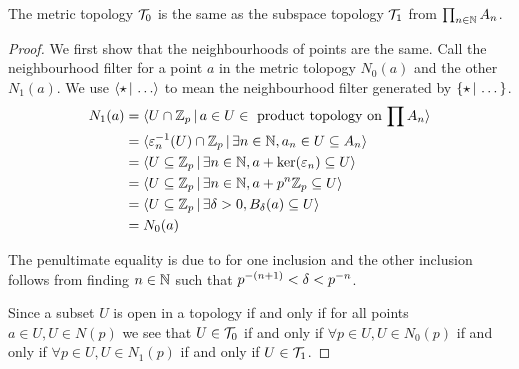 \begin{prop}
    The metric topology $\mathcal{T}_0$ is the same as the
    subspace topology $\mathcal{T}_1$ from $\prod_{n \in \mathbb{N}} A_n$.
\end{prop}
\begin{proof}
    We first show that the neighbourhoods of points are the same.
    Call the neighbourhood filter for a point $a$ 
    in the metric tolopogy $N_0(a)$
    and the other $N_1(a)$.
    We use $\<\star \st \dots\>$ to mean the neighbourhood filter generated
    by $\{\star \,|\, \dots\}$.
    \begin{align*}
        N_1(a) 
        &= \langle U \cap \mathbb{Z}_p \,|\, a \in U \in 
        \text{ product topology on $\prod A_n$}\rangle\\
        &=\langle \varepsilon_n^{-1} (U) \cap \mathbb{Z}_p \,|\, \exists n \in \mathbb{N}, 
        a_n \in U \subseteq A_n\rangle\\
        &= \langle U \subseteq \mathbb{Z}_p \,|\, \exists n \in \mathbb{N},
        a + \ker(\varepsilon_n) \subseteq U\rangle\\
        &= \langle U \subseteq \mathbb{Z}_p \,|\, \exists n \in \mathbb{N},
        a + p^n \mathbb{Z}_p \subseteq U\rangle\\
        &= \langle U \subseteq \mathbb{Z}_p \,|\, \exists \delta > 0, B_\delta(a) \subseteq U\rangle\\
        &= N_0(a)
    \end{align*}

    The penultimate equality is due to 
     for one 
    inclusion and
    the other inclusion follows from finding $n \in \mathbb{N}$
    such that $p^{-(n+1)} < \delta < p^{-n}$.
    
    Since a subset $U$ is open in a topology
    if and only if for all points $a \in U, U \in N(p)$
    we see that $U \in \mathcal{T}_0$ if and only if 
    $\forall p \in U, U \in N_0(p)$ if and only if
    $\forall p \in U, U \in N_1(p)$ if and only if
    $U \in \mathcal{T}_1$.
\end{proof}

